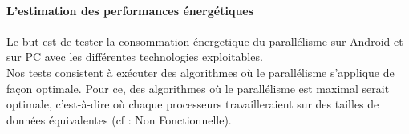 \paragraph{L'estimation des performances énergétiques \\}

	Le but est de tester la consommation énergetique du parallélisme sur Android et sur PC avec les différentes technologies exploitables. \\

	Nos tests consistent à exécuter des algorithmes où le parallélisme s'applique de façon optimale. Pour ce, des algorithmes où le parallélisme est maximal serait optimale, c'est-à-dire où chaque processeurs travailleraient sur des tailles de données équivalentes (cf : Non Fonctionnelle).
